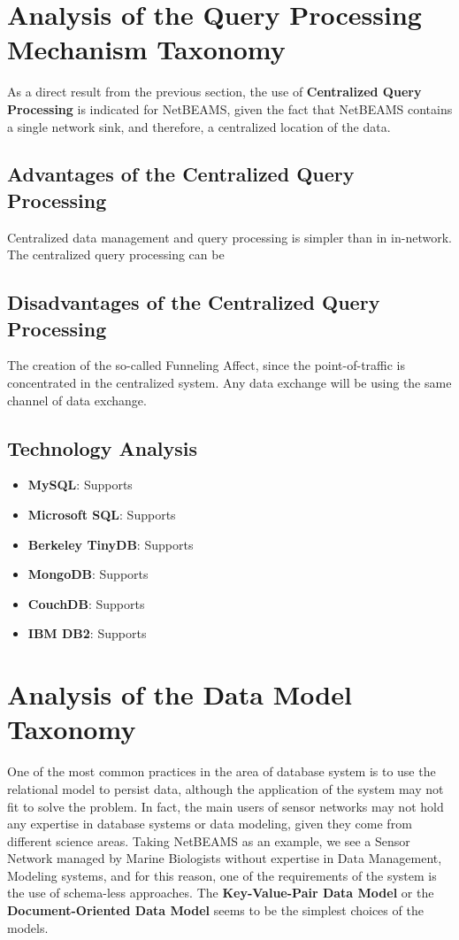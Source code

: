 \section{Analysis of the Query Processing Mechanism Taxonomy}

As a direct result from the previous section, the use of \textbf{Centralized Query
Processing} is indicated for NetBEAMS, given the fact that NetBEAMS contains
a single network sink, and therefore, a centralized location of the data.

\subsection{Advantages of the Centralized Query Processing}

Centralized data management and query processing is simpler than in in-network.
The centralized query processing can be 

\subsection{Disadvantages of the Centralized Query Processing}

The creation of the so-called Funneling Affect, since the point-of-traffic is
concentrated in the centralized system. Any data exchange will be using the
same channel of data exchange.

\subsection{Technology Analysis}

\begin{itemize}
  \item \textbf{MySQL}: Supports
  \item \textbf{Microsoft SQL}: Supports
  \item \textbf{Berkeley TinyDB}: Supports
  \item \textbf{MongoDB}: Supports
  \item \textbf{CouchDB}: Supports
  \item \textbf{IBM DB2}: Supports
\end{itemize}

\section{Analysis of the Data Model Taxonomy}

One of the most common practices in the area of database system is to use the
relational model to persist data, although the application of the system may
not fit to solve the problem. In fact, the main users of sensor networks may
not hold any expertise in database systems or data modeling, given they come
from different science areas. Taking NetBEAMS as an example, we see a Sensor
Network managed by Marine Biologists without expertise in Data Management,
Modeling systems, and for this reason, one of the requirements of the system is
the use of schema-less approaches. The \textbf{Key-Value-Pair Data Model} or the
\textbf{Document-Oriented Data Model} seems to be the simplest choices of the
models.

